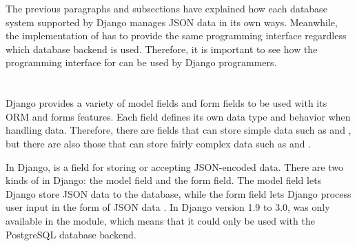 The previous paragraphs and subsections have explained how each database
system supported by Django manages JSON data in its own ways. Meanwhile, the
implementation of  has to provide the same programming
interface regardless which database backend is used. Therefore, it is important
to see how the programming interface for  can be used by Django
programmers.

\section{}

Django provides a variety of model fields and form fields to be used with its
ORM and forms features. Each field defines its own data type and behavior when
handling data. Therefore, there are fields that can store simple data such as
 and , but there are also those that can
store fairly complex data such as  and .

In Django,  is a field for storing or accepting JSON-encoded
data. There are two kinds of  in Django: the model field and
the form field. The model field lets Django store JSON data to the database,
while the form field lets Django process user input in the form of JSON data
\cite{django30_modeljsonfield, django30_formjsonfield}. In Django version
1.9 to 3.0,  was only available in the
 module, which means that it could only be used
with the PostgreSQL database backend.



\noindent
\begin{minipage}{\linewidth}

\end{minipage}

